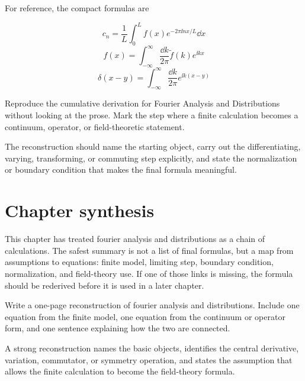 For reference, the compact formulas are

\[
  c_n=\frac1L\int_0^L f(x)e^{-2\pi\ii nx/L}\dd x
\]
\[
  f(x)=\int_{-\infty}^{\infty}\frac{\dd k}{2\pi}\tilde f(k)e^{\ii kx}
\]
\[
  \delta(x-y)=\int_{-\infty}^{\infty}\frac{\dd k}{2\pi}e^{\ii k(x-y)}
\]

\begin{exercise}
Reproduce the cumulative derivation for Fourier Analysis and Distributions without looking at the prose.  Mark the step where a finite calculation becomes a continuum, operator, or field-theoretic statement.
\begin{answer}
The reconstruction should name the starting object, carry out the differentiating, varying, transforming, or commuting step explicitly, and state the normalization or boundary condition that makes the final formula meaningful.
\end{answer}
\end{exercise}



\section{Chapter synthesis}

This chapter has treated fourier analysis and distributions as a chain of calculations.  The safest summary is not a list of final formulas, but a map from assumptions to equations: finite model, limiting step, boundary condition, normalization, and field-theory use.  If one of those links is missing, the formula should be rederived before it is used in a later chapter.

\begin{exercise}
Write a one-page reconstruction of fourier analysis and distributions.  Include one equation from the finite model, one equation from the continuum or operator form, and one sentence explaining how the two are connected.
\begin{answer}
A strong reconstruction names the basic objects, identifies the central derivative, variation, commutator, or symmetry operation, and states the assumption that allows the finite calculation to become the field-theory formula.
\end{answer}
\end{exercise}

